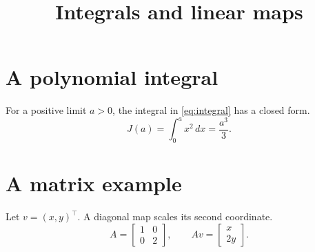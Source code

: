 \documentclass{article}
\title{Integrals and linear maps}
\author{}
\date{}
\begin{document}
\maketitle
\section{A polynomial integral}
For a positive limit $a>0$, the integral in \eqref{eq:integral} has a closed form.
\begin{equation}
  J(a)=\int_0^a x^2\,dx=\frac{a^3}{3}.
  \label{eq:integral}
\end{equation}
\section{A matrix example}
Let $v=(x,y)^\top$. A diagonal map scales its second coordinate.
\begin{equation}
  A=\begin{bmatrix}1&0\\0&2\end{bmatrix},
  \qquad Av=\begin{bmatrix}x\\2y\end{bmatrix}.
\end{equation}
\end{document}

